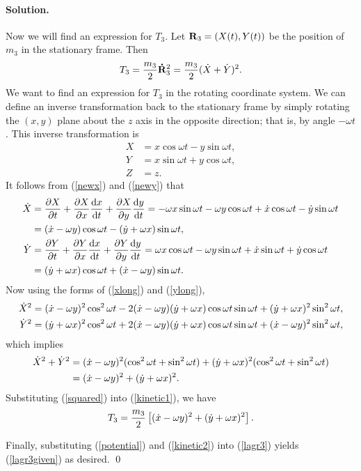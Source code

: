 \documentclass[11pt]{article}
\newcommand{\refeq}[1]{(\ref{#1})}
\newenvironment{solution}
{
    \paragraph{Solution.}
    \ignorespaces
}
{
    \bigskip
}
\begin{document}
\begin{solution}
	Now we will find an expression for $T_3$.  Let $\mathbf{R}_3 = (X(t), Y(t))$ be the position of $m_3$ in the stationary frame.  Then
	\begin{equation} \label{kinetic1}
		T_3 = \frac{m_3}{2} \mathbf{\dot{R}}_3^2 = \frac{m_3}{2} (\dot{X} + \dot{Y})^2.
	\end{equation}
	We want to find an expression for $T_3$ in the rotating coordinate system.  We can define an inverse transformation back to the stationary frame by simply rotating the $(x, y)$ plane about the $z$ axis in the opposite direction; that is, by angle $-\omega t$.  This inverse transformation is
	\begin{align}
		X &= x \cos{\omega t} - y \sin{\omega t}, \label{newx} \\
		Y &= x \sin{\omega t} + y \cos{\omega t},  \label{newy} \\
		Z &= z.
	\end{align}
	It follows from \refeq{newx} and \refeq{newy} that
	\begin{align}
		\dot{X} &= \pdv{X}{t} + \pdv{X}{x} \dv{x}{t} + \pdv{X}{y} \dv{y}{t} = - \omega x \sin{\omega t} - \omega y \cos{\omega t} + \dot{x} \cos{\omega t} - \dot{y} \sin{\omega t} \label{xlong} \\
			&= (\dot{x} - \omega y) \cos{\omega t} - (\dot{y} + \omega x) \sin{\omega t}, \\
		\dot{Y} &= \pdv{Y}{t} + \pdv{Y}{x} \dv{x}{t} + \pdv{Y}{y} \dv{y}{t} =  \omega x \cos{\omega t} - \omega y \sin{\omega t} + \dot{x} \sin{\omega t} + \dot{y} \cos{\omega t} \label{ylong} \\
		&= (\dot{y} + \omega x) \cos{\omega t} + (\dot{x} - \omega y) \sin{\omega t}.
	\end{align}
	Now using the forms of \refeq{xlong} and \refeq{ylong},
	\begin{align}
		\dot{X}^2 &= (\dot{x} - \omega y)^2 \cos^2{\omega t} - 2 (\dot{x} - \omega y) (\dot{y} + \omega x) \cos{\omega t} \sin{\omega t} + (\dot{y} + \omega x)^2 \sin^2{\omega t}, \\
		\dot{Y}^2 &= (\dot{y} + \omega x)^2 \cos^2{\omega t} + 2 (\dot{x} - \omega y) (\dot{y} + \omega x) \cos{\omega t} \sin{\omega t} + (\dot{x} - \omega y)^2 \sin^2{\omega t},
	\end{align}
	which implies
	\begin{align}
		\dot{X}^2 + \dot{Y}^2 &= (\dot{x} - \omega y)^2 (\cos^2{\omega t} + \sin^2{\omega t}) + (\dot{y} + \omega x)^2 (\cos^2{\omega t} + \sin^2{\omega t}) \\
		&= (\dot{x} - \omega y)^2 + (\dot{y} + \omega x)^2. \label{squared}
	\end{align}
	Substituting \refeq{squared} into \refeq{kinetic1}, we have
	\begin{equation} \label{kinetic2}
		T_3 = \frac{m_3}{2} \left[ (\dot{x} - \omega y)^2 + (\dot{y} + \omega x)^2 \right].
	\end{equation}
	
	Finally, substituting \refeq{potential} and \refeq{kinetic2} into \refeq{lagr3} yields \refeq{lagr3given} as desired. \qed
\end{solution}
\end{document}
